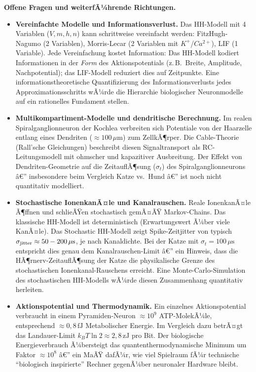 ﻿\documentclass[12pt,a4paper,titlepage]{report}
\begin{document}
\textbf{Offene Fragen und weiterfÃ¼hrende Richtungen.}
\begin{itemize}[leftmargin=2em]
  \item \textbf{Vereinfachte Modelle und Informationsverlust.}
    Das HH-Modell mit 4 Variablen ($V, m, h, n$) kann schrittweise
    vereinfacht werden: FitzHugh-Nagumo (2 Variablen),
    Morris-Lecar (2 Variablen mit $K^+$/$Ca^{2+}$),
    LIF (1 Variable).
    Jede Vereinfachung kostet Information:
    Das HH-Modell kodiert Informationen in der \emph{Form}
    des Aktionspotentials (z.\,B.\ Breite, Amplitude, Nachpotential);
    das LIF-Modell reduziert dies auf Zeitpunkte.
    Eine informationstheoretische Quantifizierung des
    Informationsverlusts jedes Approximationsschritts wÃ¼rde
    die Hierarchie biologischer Neuronmodelle auf ein
    rationelles Fundament stellen.
  \item \textbf{Multikompartiment-Modelle und dendritische Berechnung.}
    Im realen Spiralganglionneuron der Kochlea verbreiten sich
    Potentiale von der Haarzelle entlang eines Dendriten
    ($\approx 100\,\mu\mathrm{m}$) zum ZellkÃ¶rper.
    Die Cable-Theorie (Rall'sche Gleichungen) beschreibt diesen
    Signaltransport als RC-Leitungsmodell mit ohmscher und
    kapazitiver Ausbreitung.
    Der Effekt von Dendriten-Geometrie auf die ZeitauflÃ¶sung
    ($\sigma_t$) des Spiralganglionneurons â€” insbesondere
    beim Vergleich Katze vs.\ Hund â€” ist noch nicht quantitativ modelliert.
  \item \textbf{Stochastische IonenkanÃ¤le und Kanalrauschen.}
    Reale IonenkanÃ¤le Ã¶ffnen und schlieÃŸen stochastisch
    gemÃ¤ÃŸ Markov-Chains.
    Das klassische HH-Modell ist deterministisch (Erwartungswert
    Ã¼ber viele KanÃ¤le).
    Das Stochastic HH-Modell zeigt Spike-Zeitjitter
    von typisch $\sigma_{\rm jitter} \approx 50-200\,\mu\mathrm{s}$,
    je nach Kanaldichte.
    Bei der Katze mit $\sigma_t = 100\,\mu\mathrm{s}$ entspricht
    dies genau dem Kanalrauschen-Limit â€”
    ein Hinweis, dass die HÃ¶rnerv-ZeitauflÃ¶sung der Katze die
    physikalische Grenze des stochastischen Ionenkanal-Rauschens
    erreicht.
    Eine Monte-Carlo-Simulation des stochastischen HH-Modells
    wÃ¼rde diesen Zusammenhang quantitativ herleiten.
  \item \textbf{Aktionspotential und Thermodynamik.}
    Ein einzelnes Aktionspotential verbraucht in einem
    Pyramiden-Neuron $\approx 10^9$ ATP-MolekÃ¼le,
    entsprechend $\approx 0{,}8\,\mathrm{fJ}$ Metabolischer Energie.
    Im Vergleich dazu betrÃ¤gt das Landauer-Limit $k_BT\ln2 \approx 2{,}8\,\mathrm{zJ}$
    pro Bit.
    Der biologische Energieverbrauch Ã¼bersteigt das quantenthermodynamische
    Minimum um Faktor $\approx 10^8$ â€”
    ein MaÃŸ dafÃ¼r, wie viel Spielraum fÃ¼r technische ``biologisch inspirierte''
    Rechner gegenÃ¼ber neuronaler Hardware bleibt.
\end{itemize}
\end{document}

